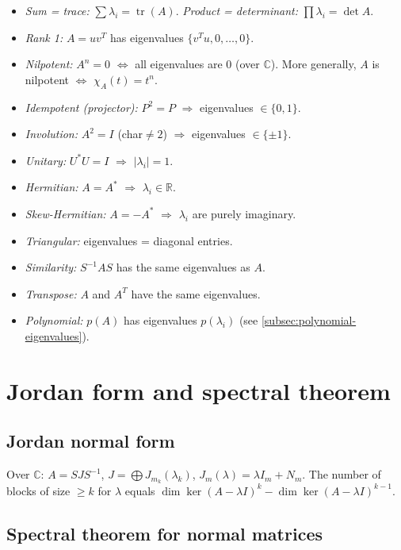 \begin{itemize}
\item \textit{Sum = trace:} $\sum\lambda_i=\operatorname{tr}(A)$. \textit{Product = determinant:} $\prod\lambda_i=\det A$.
\item \textit{Rank 1:} $A=uv^T$ has eigenvalues $\{v^Tu,0,\dots,0\}$.
\item \textit{Nilpotent:} $A^n=0$ $\iff$ all eigenvalues are $0$ (over $\mathbb{C}$). More generally, $A$ is nilpotent $\iff$ $\chi_A(t)=t^n$.
\item \textit{Idempotent (projector):} $P^2=P$ $\Rightarrow$ eigenvalues $\in\{0,1\}$.
\item \textit{Involution:} $A^2=I$ (char$\neq2$) $\Rightarrow$ eigenvalues $\in\{\pm1\}$.
\item \textit{Unitary:} $U^*U=I$ $\Rightarrow$ $|\lambda_i|=1$.
\item \textit{Hermitian:} $A=A^*$ $\Rightarrow$ $\lambda_i\in\mathbb{R}$.
\item \textit{Skew-Hermitian:} $A=-A^*$ $\Rightarrow$ $\lambda_i$ are purely imaginary.
\item \textit{Triangular:} eigenvalues = diagonal entries.
\item \textit{Similarity:} $S^{-1}AS$ has the same eigenvalues as $A$.
\item \textit{Transpose:} $A$ and $A^T$ have the same eigenvalues.
\item \textit{Polynomial:} $p(A)$ has eigenvalues $p(\lambda_i)$ (see \ref{subsec:polynomial-eigenvalues}).
\end{itemize}

\medskip

\section{Jordan form and spectral theorem}
\label{sec:jordan-spectral}

\subsection{Jordan normal form}
\label{subsec:jordan-form}

Over $\mathbb{C}$: $A=SJS^{-1}$, $J=\bigoplus J_{m_k}(\lambda_k)$, $J_m(\lambda)=\lambda I_m+N_m$. The number of blocks of size $\ge k$ for $\lambda$ equals $\dim\ker(A-\lambda I)^k-\dim\ker(A-\lambda I)^{k-1}$.

\subsection{Spectral theorem for normal matrices}
\label{subsec:spectral-theorem}

